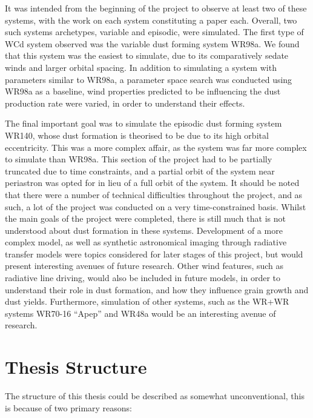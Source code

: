 \noindent
It was intended from the beginning of the project to observe at least two of these systems, with the work on each system constituting a paper each.
Overall, two such systems archetypes, variable and episodic, were simulated.
The first type of WCd system observed was the variable dust forming system WR98a.
We found that this system was the easiest to simulate, due to its comparatively sedate winds and larger orbital spacing. 
In addition to simulating a system with parameters similar to WR98a, a parameter space search was conducted using WR98a as a baseline, wind properties predicted to be influencing the dust production rate were varied, in order to understand their effects.

The final important goal was to simulate the episodic dust forming system WR140, whose dust formation is theorised to be due to its high orbital eccentricity.
This was a more complex affair, as the system was far more complex to simulate than WR98a.
This section of the project had to be partially truncated due to time constraints, and a partial orbit of the system near periastron was opted for in lieu of a full orbit of the system.
It should be noted that there were a number of technical difficulties throughout the project, and as such, a lot of the project was conducted on a very time-constrained basis.
Whilst the main goals of the project were completed, there is still much that is not understood about dust formation in these systems.
Development of a more complex model, as well as synthetic astronomical imaging through radiative transfer models were topics considered for later stages of this project, but would present interesting avenues of future research.
Other wind features, such as radiative line driving, would also be included in future models, in order to understand their role in dust formation, and how they influence grain growth and dust yields.
Furthermore, simulation of other systems, such as the WR+WR systems WR70-16 ``Apep'' and WR48a would be an interesting avenue of research.

\section{Thesis Structure}

The structure of this thesis could be described as somewhat unconventional, this is because of two primary reasons:

